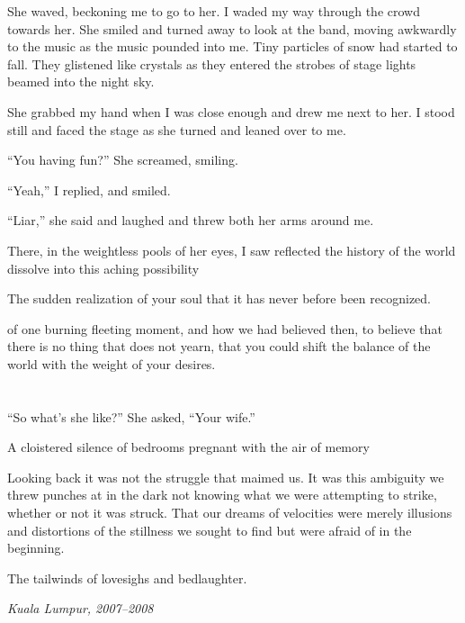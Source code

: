 \documentclass[11pt]{article}
\begin{document}
	She waved, beckoning me to go to her. I waded my way through the crowd towards
her. She smiled and turned away to look at the band, moving awkwardly to the
music as the music pounded into me. Tiny particles of snow had started to fall.
They glistened like crystals as they entered the strobes of stage lights beamed
into the night sky.

	She grabbed my hand when I was close enough and drew me next to her. I stood
still and faced the stage as she turned and leaned over to me.

	``You having fun?'' She screamed, smiling.

	``Yeah,'' I replied, and smiled.

	``Liar,'' she said and laughed and threw both her arms around me.

	There, in the weightless pools of her eyes, I saw reflected the history of the
world dissolve into this aching possibility

	The sudden realization of your soul that it has never before been recognized.

of one burning fleeting moment, and how we had believed then, to believe that
there is no thing that does not yearn, that you could shift the balance of the
world with the weight of your desires.


\section{} %
\label{sec:section_name}

	``So what’s she like?'' She asked, ``Your wife.''

	A cloistered silence of bedrooms pregnant with the air of memory

	Looking back it was not the struggle that maimed us. It was this ambiguity we
threw punches at in the dark not knowing what we were attempting to strike,
whether or not it was struck. That our dreams of velocities were merely
illusions and distortions of the stillness we sought to find but were afraid of
in the beginning.

	The tailwinds of lovesighs and bedlaughter.



\begin{flushright}\emph{Kuala Lumpur, 2007--2008}\end{flushright}
\end{document}
